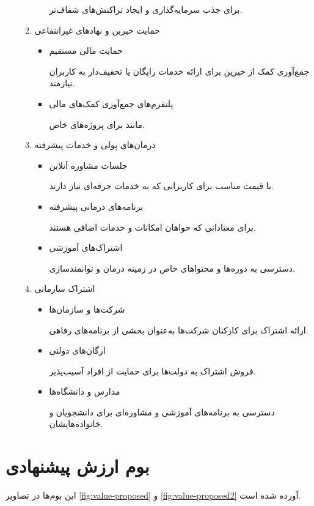\documentclass[dvipsnames, svgnames, x11names, 11pt]{article}
\begin{document}
\begin{itemize}
\begin{enumerate}
\begin{itemize}
برای جذب سرمایه‌گذاری و ایجاد تراکنش‌های شفاف‌تر.  
\end{itemize}

\item 
حمایت خیرین و نهادهای غیرانتفاعی  
\begin{itemize}
\item 
حمایت مالی مستقیم

جمع‌آوری کمک از خیرین برای ارائه خدمات رایگان یا تخفیف‌دار به کاربران نیازمند.  

\item 
پلتفرم‌های جمع‌آوری کمک‌های مالی

مانند  برای پروژه‌های خاص.  
\end{itemize}

\item 
درمان‌های پولی و خدمات پیشرفته  
\begin{itemize}
\item 
جلسات مشاوره آنلاین

با قیمت مناسب برای کاربرانی که به خدمات حرفه‌ای نیاز دارند.  

\item 
برنامه‌های درمانی پیشرفته

برای معتادانی که خواهان امکانات و خدمات اضافی هستند.  

\item 
اشتراک‌های آموزشی

دسترسی به دوره‌ها و محتواهای خاص در زمینه درمان و توانمندسازی.  
\end{itemize}

\item 
اشتراک سازمانی   
\begin{itemize}
\item 
شرکت‌ها و سازمان‌ها

ارائه اشتراک برای کارکنان شرکت‌ها به‌عنوان بخشی از برنامه‌های رفاهی.  

\item 
ارگان‌های دولتی

فروش اشتراک به دولت‌ها برای حمایت از افراد آسیب‌پذیر.  

\item 
مدارس و دانشگاه‌ها

دسترسی به برنامه‌های آموزشی و مشاوره‌ای برای دانشجویان و خانواده‌هایشان.  
\end{itemize}
\end{enumerate}
\end{itemize}

\section{بوم ارزش پیشنهادی}
این بوم‌ها در تصاویر 
\ref{fig:value-proposed}
و
\ref{fig:value-proposed2}
 آورده شده است.
\end{document}
